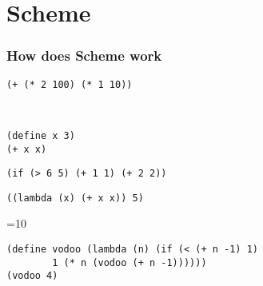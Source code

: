 \section[Scheme]{Scheme}

\begin{frame}[fragile]
    \frametitle{How does Scheme work}
\begin{lstlisting}
(+ (* 2 100) (* 1 10))
\end{lstlisting}
\\
\pause
\begin{lstlisting}
(define x 3)
(+ x x)
\end{lstlisting}
\pause
\begin{lstlisting}
(if (> 6 5) (+ 1 1) (+ 2 2))
\end{lstlisting}
\pause
\begin{lstlisting}
((lambda (x) (+ x x)) 5)
\end{lstlisting}
=10
\pause
\begin{lstlisting}
(define vodoo (lambda (n) (if (< (+ n -1) 1)
        1 (* n (vodoo (+ n -1))))))
(vodoo 4)
\end{lstlisting}

\end{frame}
